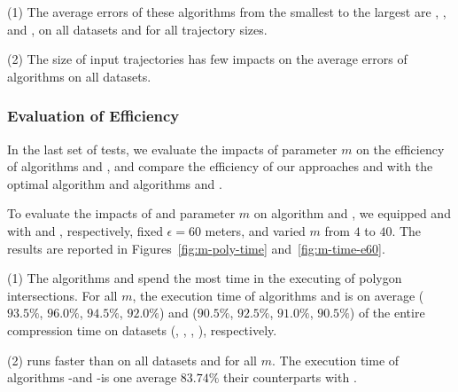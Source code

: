 {\ni(1) The average errors of these algorithms from the smallest to the largest are \squishe, \dps, \cist and \cista, on all datasets and for all trajectory sizes. %

\ni(2) The size of input trajectories has few impacts on the average errors of \lsa algorithms on all datasets.





\subsubsection{Evaluation of Efficiency}

In the last set of tests, we evaluate the impacts of parameter $m$ on the efficiency of algorithms \cist and \cista, and compare the efficiency of our approaches \cist and \cista with the optimal algorithm and algorithms \dps and \squishe.

%

To evaluate the impacts of \rpia and parameter $m$ on algorithm \cist and \cista, we
equipped \cist and \cista with \rpia and \cpia, respectively, fixed $\epsilon =60$ meters, and varied $m$ from $4$ to $40$.
%
The results are reported in Figures~\ref{fig:m-poly-time} and~\ref{fig:m-time-e60}.

\ni(1) The algorithms \cist and \cista spend the most time in the executing of
polygon intersections. For all $m$, the execution time of algorithms \cpia and
\rpia is on average {($93.5\%$, $96.0\%$, $94.5\%$, $92.0\%$)
	and ($90.5\%$, $92.5\%$, $91.0\%$, $90.5\%$)} of the entire compression  time on {datasets}
(\sercar, \geolife, \mopsi, \pricar), respectively.

\ni(2) \rpia runs faster than \cpia on all datasets and for all $m$. The execution time of algorithms \cist-\rpia and \cista-\rpia is one average $83.74\%$ their counterparts with \cpia.

}
